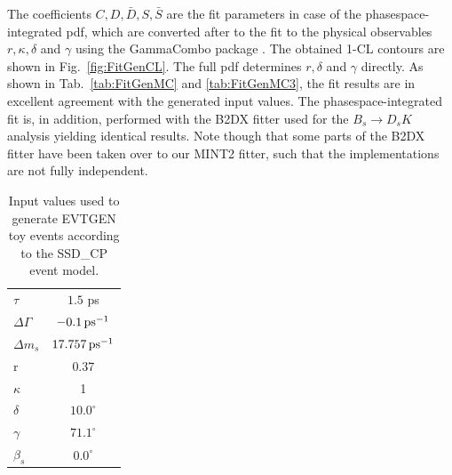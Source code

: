 The \CP coefficients $C,D,\bar D,S,\bar S$ are the fit parameters in case of the phasespace-integrated pdf,
which are converted after to the fit to the physical observables $r,\kappa,\delta$ and $\gamma$ using the \textsf{GammaCombo} package \cite{GammaCombo}.
The obtained 1-CL contours are shown in Fig.~\ref{fig:FitGenCL}. %
The full pdf determines $r,\delta$ and $\gamma$ directly.
As shown in Tab.~\ref{tab:FitGenMC}%
and \ref{tab:FitGenMC3}, the fit results are in excellent agreement with the generated input values.
The phasespace-integrated fit is, in addition, performed with the \textsf{B2DX} fitter used for the $B_s \to D_s K$ analysis yielding identical results.
Note though that some parts of the \textsf{B2DX} fitter have been taken over to our \textsf{MINT2} fitter, such that the implementations are not fully independent.

\begin{table}[h]
\caption{Input values used to generate \textsf{EVTGEN} toy events according to the \textsf{SSD\_CP} event model.} 		
  \centering
  \begin{tabular}
    {l c}
    \hline \hline
    $\tau$  & $1.5$ ps \\   
    $\Delta\Gamma$  & $-0.1 {\mathrm{ \,ps}}^{-1}$ \\   
     $\Delta m_s$  & $17.757 {\mathrm{ \,ps}}^{-1}$ \\   
     r & 0.37\\
     $\kappa$ & 1\\
     $\delta$ & $10.0^\circ$\\
     $\gamma$ & $71.1^\circ$\\
     $\beta_s$ & $0.0^\circ$\\
    \hline \hline
  \end{tabular}
  \label{tab:InputGenMC}
\end{table}

